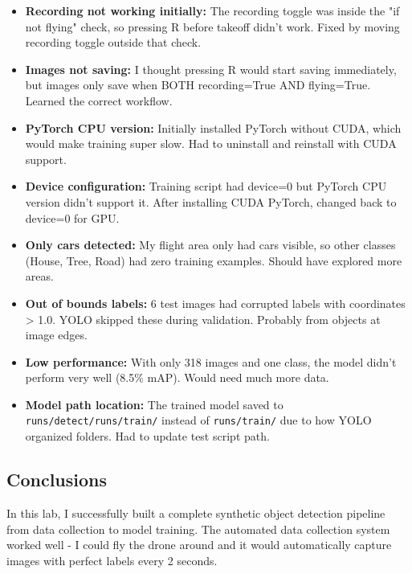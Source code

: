 \begin{itemize}
	\item \textbf{Recording not working initially:} The recording toggle was inside the "if not flying" check, so pressing R before takeoff didn't work. Fixed by moving recording toggle outside that check.
	
	\item \textbf{Images not saving:} I thought pressing R would start saving immediately, but images only save when BOTH recording=True AND flying=True. Learned the correct workflow.
	
	\item \textbf{PyTorch CPU version:} Initially installed PyTorch without CUDA, which would make training super slow. Had to uninstall and reinstall with CUDA support.
	
	\item \textbf{Device configuration:} Training script had device=0 but PyTorch CPU version didn't support it. After installing CUDA PyTorch, changed back to device=0 for GPU.
	
	\item \textbf{Only cars detected:} My flight area only had cars visible, so other classes (House, Tree, Road) had zero training examples. Should have explored more areas.
	
	\item \textbf{Out of bounds labels:} 6 test images had corrupted labels with coordinates > 1.0. YOLO skipped these during validation. Probably from objects at image edges.
	
	\item \textbf{Low performance:} With only 318 images and one class, the model didn't perform very well (8.5\% mAP). Would need much more data.
	
	\item \textbf{Model path location:} The trained model saved to \texttt{runs/detect/runs/train/} instead of \texttt{runs/train/} due to how YOLO organized folders. Had to update test script path.
\end{itemize}

\subsection{Conclusions}

In this lab, I successfully built a complete synthetic object detection pipeline from data collection to model training. The automated data collection system worked well - I could fly the drone around and it would automatically capture images with perfect labels every 2 seconds.

